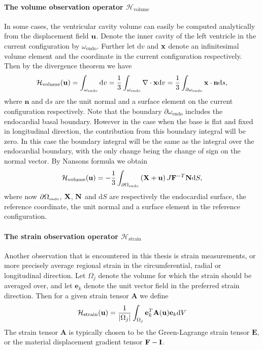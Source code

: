 \paragraph{The volume observation operator
  $\mathcal{H}_{\mathrm{volume}}$}
In some cases, the ventricular cavity volume can easily be computed
analytically from the displacement field $\mathbf{u}$. Denote the inner
cavity of the left ventricle in the current configuration by
$\omega_{\mathrm{endo}}$. Further let $\mathrm{d} v$ and $\mathbf{x}$
denote an infinitesimal volume element and the coordinate in the
current configuration respectively. Then by the divergence theorem we have
\begin{align}
  \mathcal{H}_{\mathrm{volume}}(\mathbf{u})= \int_{\omega_{\mathrm{endo}}} \mathrm{d} v =
  \frac{1}{3}\int_{\omega_{\mathrm{endo}}} \nabla \cdot \mathbf{x} \mathrm{d} v =
  \frac{1}{3}\int_{\partial \omega_{\mathrm{endo}}} \mathbf{x} \cdot \mathbf{n} \mathrm{d} s, 
\end{align}
where $\mathbf{n}$ and $\mathrm{d} s$ are the unit normal and a surface
element on the current configuration respectively.
Note that the boundary $\partial \omega_{\mathrm{endo}}$ includes the
endocardial basal boundary. However in the case when the base is flat
and fixed in longitudinal direction, the contribution from this
boundary integral will be zero. In this case the boundary integral
will be the same as the integral over the endocardial boundary, with
the only change being the change of sign on the normal vector. By
Nansons formula we obtain 
\begin{align}
  \mathcal{H}_{\mathrm{volume}}(\mathbf{u})= -\frac{1}{3}\int_{\partial \Omega_{ \textnormal{\tiny \text{endo}}}} \left( \mathbf{X} + \mathbf{u} \right) J \mathbf{F}^{-T} \mathbf{N} \mathrm{d}S,
  \label{eq:volume_operator}
\end{align}
where now $\partial \Omega_{ \textnormal{\tiny \text{endo}}}$,  $\mathbf{X}$, $\mathbf{N}$ and $\mathrm{d}S$ are respectively the
endocardial surface, the reference coordinate, the unit normal and a
surface element in the reference configuration.


\paragraph{The strain observation operator
  $\mathcal{H}_{\mathrm{strain}}$}
Another observation that is encountered in this thesis is strain
measurements, or more precisely average regional strain in the
circumferential, radial or longitudinal direction. Let $\Omega_j$
denote the volume for which the strain should be averaged over, and
let $\mathbf{e}_k$ denote the unit vector field in the preferred strain
direction. Then for a given strain tensor $\mathbf{A}$ we define 
\begin{align}
  \mathcal{H}_{\mathrm{strain}}(\mathbf{u}) = \frac{1}{|\Omega_j|}\int_{\Omega_j} \mathbf{e}_k^T \mathbf{A}(\mathbf{u}) \mathbf{e}_k  \mathrm{d}V
\end{align}
The strain tensor $ \mathbf{A}$ is typically chosen to be the
Green-Lagrange strain tensor $\mathbf{E}$, or
the material displacement gradient tensor $\mathbf{F} - \mathbf{I}$.

